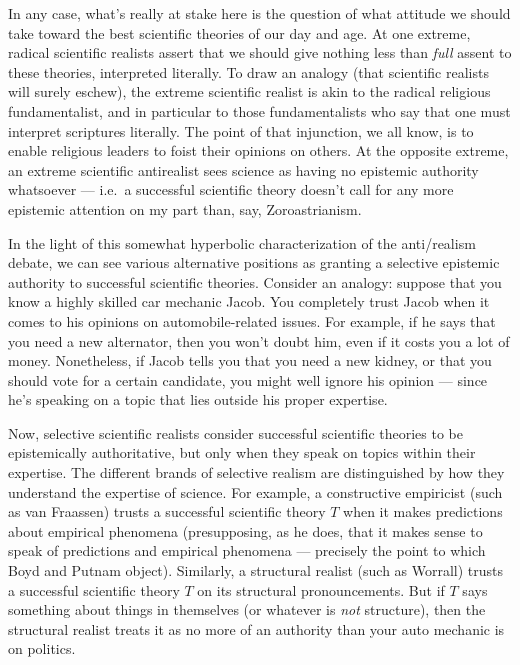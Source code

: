 In any case, what's really at stake here is the question of what
attitude we should take toward the best scientific theories of our day
and age.  At one extreme, radical scientific realists assert that we
should give nothing less than {\it full} assent to these theories,
interpreted literally.  To draw an analogy (that scientific realists
will surely eschew), the extreme scientific realist is akin to the
radical religious fundamentalist, and in particular to those
fundamentalists who say that one must interpret scriptures literally.
The point of that injunction, we all know, is to enable religious
leaders to foist their opinions on others.  At the opposite extreme,
an extreme scientific antirealist sees science as having no epistemic
authority whatsoever --- i.e.\ a successful scientific theory doesn't
call for any more epistemic attention on my part than, say,
Zoroastrianism.

In the light of this somewhat hyperbolic characterization of the
anti/realism debate, we can see various alternative positions as
granting a selective epistemic authority to successful scientific
theories.  Consider an analogy: suppose that you know a highly skilled
car mechanic Jacob.  You completely trust Jacob when it comes to his
opinions on automobile-related issues.  For example, if he says that
you need a new alternator, then you won't doubt him, even if it costs
you a lot of money.  Nonetheless, if Jacob tells you that you need a
new kidney, or that you should vote for a certain candidate, you might
well ignore his opinion --- since he's speaking on a topic that lies
outside his proper expertise.

Now, selective scientific realists consider successful scientific
theories to be epistemically authoritative, but only when they speak
on topics within their expertise.  The different brands of selective
realism are distinguished by how they understand the expertise of
science.  For example, a constructive empiricist (such as van
Fraassen) trusts a successful scientific theory $T$ when it makes
predictions about empirical phenomena (presupposing, as he does, that
it makes sense to speak of predictions and empirical phenomena ---
precisely the point to which Boyd and Putnam object).  Similarly, a
structural realist (such as Worrall) trusts a successful scientific
theory $T$ on its structural pronouncements.  But if $T$ says
something about things in themselves (or whatever is {\it not}
structure), then the structural realist treats it as no more of an
authority than your auto mechanic is on politics.

